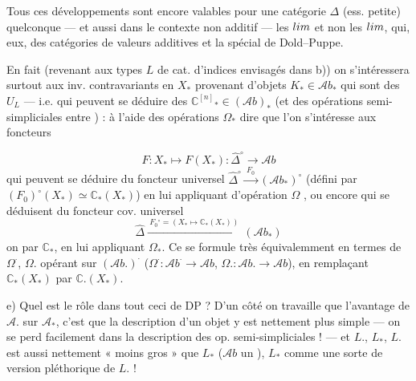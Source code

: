 \documentclass[11pt,a4paper]{article}
\begin{document}
Tous ces développements sont encore valables pour une catégorie $\Delta$ (ess. petite)
quelconque --- et aussi dans le contexte non additif ---  
les $\varinjlim$ et non les $\varprojlim$, qui, eux,  des
catégories de valeurs additives et la \uncertain{\ill{}} spécial de Dold--Puppe.

En fait (revenant aux types $L$ de cat. d'indices envisagés dans b)) on s'intéressera
surtout aux inv. contravariants en $X_{*}$ provenant d'objets $K_{*} \in \mathcal{A}b_{*}$
qui sont des $U_{L}$ --- i.e. qui peuvent se déduire des 
$\mathbb{C}^{[n]}{}_{*} \in (\mathcal{A}b)_{*}$ (et des opérations semi-simpliciales
entre ) : à l'aide des  opérations $\Omega_{*}$
\struck{\ill{}}
 dire que l'on s'intéresse aux foncteurs \struck{\ill{}}

\[
  F : X_{*} \longmapsto F(X_{*}) : \widehat{\Delta}^{\circ} \to \mathcal{A}b
\]
qui peuvent se déduire du foncteur universel
$\widehat{\Delta}^{\circ} \xrightarrow{\ F_{0}\ } (\mathcal{A}b_{*})^{\circ}$
(défini par $(F_{0})^{\circ}(X_{*}) \simeq \mathbb{C}_{*}(X_{*})$) en lui appliquant
d'opération $\Omega$ , ou encore qui se
déduisent du foncteur cov. universel
\[
  \widehat{\Delta} \xrightarrow{\ F_{0}{}^{\circ} = (X_{*} \mapsto \mathbb{C}_{*}(X_{*}))\ } (\mathcal{A}b_{*})
\]
 on  par $\mathbb{C}_{*}$, en lui appliquant  $\Omega_{*}$. Ce \struck{\ill{}}  se formule très
équivalemment en termes de $\Omega^{\cdot}$, $\Omega.$ opérant sur $(\mathcal{A}b.)^{\cdot}$
($\Omega^{\cdot} : \mathcal{A}b^{\cdot} \to \mathcal{A}b$, $\Omega. : \mathcal{A}b. \to \mathcal{A}b$),
en remplaçant $\mathbb{C}_{*}(X_{*})$ par $\mathbb{C}.(X_{*})$.

e) Quel est le rôle dans tout ceci de DP ? \struck{\ill{}} D'un côté on travaille que
l'avantage de $\mathcal{A}.$ sur $\mathcal{A}_{*}$, c'est que la description d'un objet
y est nettement plus simple --- on se perd facilement dans la description des op.
semi-simpliciales ! --- et    $L.$, $L_{*}$,
$L.$ est aussi nettement « moins gros » que $L_{*}$ ($\mathcal{A}b$ un 
\ill{} \ill{}   ), $L_{*}$
 comme une sorte de version pléthorique de $L.$ !
\end{document}
